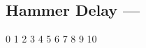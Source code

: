 \subsection[Hammer Delay]{Hammer Delay --- \UiKey{\I}\UiKey{\SET}}









































0
1
2
3
4
5
6
7
8
9
10
